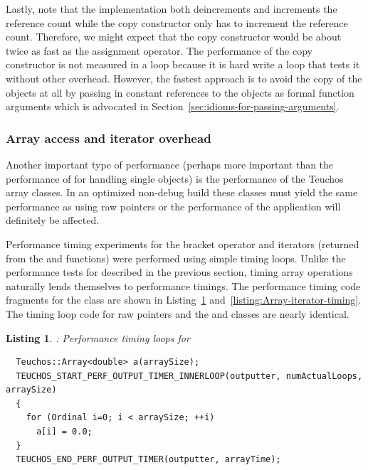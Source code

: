 \documentclass[pdf,ps2pdf,11pt]{SANDreport}
\newtheorem{listing}{Listing}
\begin{document}
Lastly, note that the {} implementation both
deincrements and increments the reference count while the copy
constructor only has to increment the reference count.  Therefore, we
might expect that the copy constructor would be about twice as fast as
the assignment operator.  The performance of the copy constructor is
not measured in a loop because it is hard write a loop that tests it
without other overhead.  However, the fastest approach is to avoid the
copy of the {} objects at all by passing in constant
references to the {} objects as formal function arguments
which is advocated in Section~\ref{sec:idioms-for-passing-arguments}.


%
{}\subsubsection{Array access and iterator overhead}
\label{sec:array-overhead}
%

Another important type of performance (perhaps more important than the
performance of {} for handling single objects) is the
performance of the Teuchos array classes.  In an optimized non-debug
build these classes must yield the same performance as using raw
pointers or the performance of the application will definitely be
affected.

Performance timing experiments for the bracket operator
{} and iterators (returned from the
{} and {} functions) were performed using
simple timing loops.  Unlike the performance tests for {}
described in the previous section, timing array operations naturally
lends themselves to performance timings.  The performance timing code
fragments for the {} class are shown in
Listing~\ref{listing:Array-bracket-timing}
and~\ref{listing:Array-iterator-timing}.  The timing loop code for raw
pointers and the {} and {} classes are
nearly identical.


\begin{listing}: Performance timing loops for
{} \\
\label{listing:Array-bracket-timing}
{\small\begin{verbatim}
  Teuchos::Array<double> a(arraySize); 
  TEUCHOS_START_PERF_OUTPUT_TIMER_INNERLOOP(outputter, numActualLoops, arraySize) 
  { 
    for (Ordinal i=0; i < arraySize; ++i) 
      a[i] = 0.0; 
  }
  TEUCHOS_END_PERF_OUTPUT_TIMER(outputter, arrayTime); 
\end{verbatim}}
\end{listing}
\end{document}
